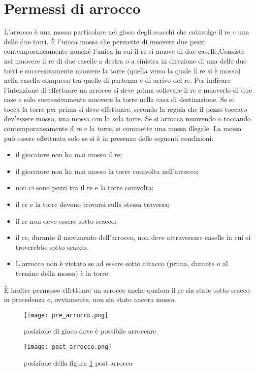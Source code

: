 \section{Permessi di arrocco}
\label{arrocco}
L'arrocco è  una mossa particolare nel gioco degli scacchi che coinvolge il re e una delle due
torri. È l'unica mossa che permette di muovere due pezzi contemporaneamente nonché l'unica
in cui il re si muove di due caselle,Consiste nel muovere il re di due caselle a destra o a sinistra in direzione di una delle due torri e successivamente muovere la torre
(quella verso la quale il re si è mosso) nella casella compresa tra quelle di partenza e di arrivo del re.
Per indicare l'intenzione di effettuare un arrocco si deve prima sollevare il re e muoverlo di due case e solo successivamente muovere la torre nella casa di destinazione. Se si tocca la torre per prima si
deve effettuare, secondo la regola che il pezzo toccato dev'essere mosso, una mossa con la sola torre. Se si arrocca muovendo o toccando contemporaneamente il re e la torre, si commette una mossa illegale.
La mossa può essere effettuata solo se si è in presenza delle seguenti condizioni:
\begin{itemize}
    \item   il giocatore non ha mai mosso il re;
    \item il giocatore non ha mai mosso la torre coinvolta nell'arrocco;
    \item   non ci sono pezzi tra il re e la torre coinvolta;
    \item il re e la torre devono trovarsi sulla stessa traversa;
    \item  il re non deve essere sotto scacco;
    \item   il re, durante il movimento dell'arrocco, non deve attraversare caselle in cui si troverebbe sotto scacco.
    \item  L'arrocco non è vietato se ad essere sotto attacco (prima, durante o al termine della mossa) è la torre.
\end{itemize}
È inoltre permesso effettuare un arrocco anche qualora il re sia stato sotto scacco in precedenza e, ovviamente, non sia stato ancora mosso.

\begin{figure}[!tbp]
    \centering
    \begin{minipage}[b]{0.4\textwidth}
        \texttt{[image: pre\_arrocco.png]}
        \caption{posizione di gioco dove è possibile arroccare}
        \label{prearrocco}
    \end{minipage}
    \hfill
    \begin{minipage}[b]{0.4\textwidth}
        \texttt{[image: post\_arrocco.png]}
        \caption{posizione della figura \ref{prearrocco} post arrocco}
    \end{minipage}
\end{figure}

